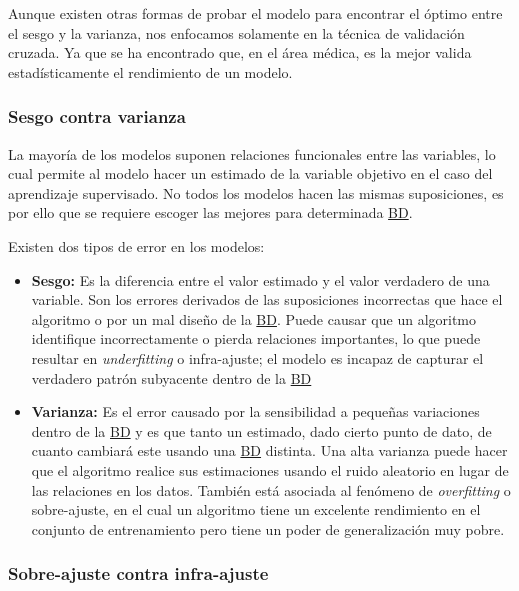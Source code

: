 Aunque existen otras formas de probar el modelo para encontrar el óptimo entre
el sesgo y la varianza, nos enfocamos solamente en la técnica de validación
cruzada. Ya que se ha encontrado que, en el área médica, es la mejor valida
estadísticamente el rendimiento de un modelo.~\cite{Ambroise2002}

\subsubsection{Sesgo contra varianza}

La mayoría de los modelos suponen relaciones funcionales entre las variables, lo
cual permite al modelo hacer un estimado de la variable objetivo en el caso del
aprendizaje supervisado. No todos los modelos hacen las mismas suposiciones, es
por ello que se requiere escoger las mejores para determinada
\hyperlink{abbr}{BD}.

Existen dos tipos de error en los modelos:

\begin{itemize}
    \item{\textbf{Sesgo: }} Es la diferencia entre el valor estimado y el valor
    verdadero de una variable. Son los errores derivados de las suposiciones
    incorrectas que hace el algoritmo o por un mal diseño de la
    \hyperlink{abbr}{BD}. Puede causar que un algoritmo identifique
    incorrectamente o pierda relaciones importantes, lo que puede resultar en
    \emph{underfitting}  o infra-ajuste; el modelo es
    incapaz de capturar el verdadero patrón subyacente dentro de la
    \hyperlink{abbr}{BD}
    \item{\textbf{Varianza: }} Es el error causado por la sensibilidad a
    pequeñas variaciones dentro de la \hyperlink{abbr}{BD} y es que tanto un
    estimado, dado cierto punto de dato, de cuanto cambiará este usando una
    \hyperlink{abbr}{BD} distinta. Una alta varianza puede hacer que el
    algoritmo realice sus estimaciones usando el ruido aleatorio en lugar de las
    relaciones en los datos. También está asociada al fenómeno de \emph{overfitting}
     o sobre-ajuste, en el cual un algoritmo tiene un
    excelente rendimiento en el conjunto de entrenamiento pero tiene un poder de
    generalización muy pobre.
\end{itemize}

\subsubsection{Sobre-ajuste contra infra-ajuste}


